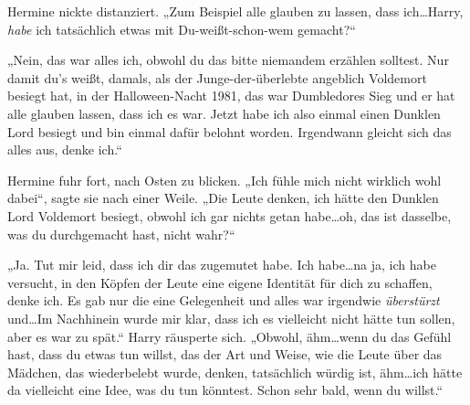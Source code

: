 Hermine nickte distanziert. „Zum Beispiel alle glauben zu lassen, dass ich…Harry, \emph{habe} ich tatsächlich etwas mit Du-weißt-schon-wem gemacht?“

„Nein, das war alles ich, obwohl du das bitte niemandem erzählen solltest. Nur damit du’s weißt, damals, als der Junge-der-überlebte angeblich Voldemort besiegt hat, in der Halloween-Nacht 1981, das war Dumbledores Sieg und er hat alle glauben lassen, dass ich es war. Jetzt habe ich also einmal einen Dunklen Lord besiegt und bin einmal dafür belohnt worden. Irgendwann gleicht sich das alles aus, denke ich.“

Hermine fuhr fort, nach Osten zu blicken.
„Ich fühle mich nicht wirklich wohl dabei“, sagte sie nach einer Weile. „Die Leute denken, ich hätte den Dunklen Lord Voldemort besiegt, obwohl ich gar nichts getan habe…oh, das ist dasselbe, was du durchgemacht hast, nicht wahr?“

„Ja. Tut mir leid, dass ich dir das zugemutet habe. Ich habe…na ja, ich habe versucht, in den Köpfen der Leute eine eigene Identität für dich zu schaffen, denke ich. Es gab nur die eine Gelegenheit und alles war irgendwie \emph{überstürzt} und…Im Nachhinein wurde mir klar, dass ich es vielleicht nicht hätte tun sollen, aber es war zu spät.“ Harry räusperte sich. „Obwohl, ähm…wenn du das Gefühl hast, dass du etwas tun willst, das der Art und Weise, wie die Leute über das Mädchen, das wiederbelebt wurde, denken, tatsächlich würdig ist, ähm…ich hätte da vielleicht eine Idee, was du tun könntest. Schon sehr bald, wenn du willst.“

